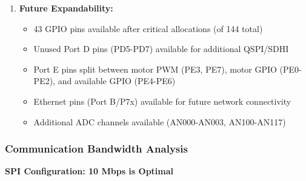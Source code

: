 \begin{enumerate}
        \item \textbf{Future Expandability:}
        \begin{itemize}
        \item 43 GPIO pins available after critical allocations (of 144 total)
        \item Unused Port D pins (PD5-PD7) available for additional QSPI/SDHI
        \item Port E pins split between motor PWM (PE3, PE7), motor GPIO (PE0-PE2), and available GPIO (PE4-PE6)
        \item Ethernet pins (Port B/P7x) available for future network connectivity
        \item Additional ADC channels available (AN000-AN003, AN100-AN117)
    \end{itemize}
        \end{enumerate}

        \subsubsection{Communication Bandwidth Analysis}

\textbf{SPI Configuration: 10 Mbps is Optimal}

